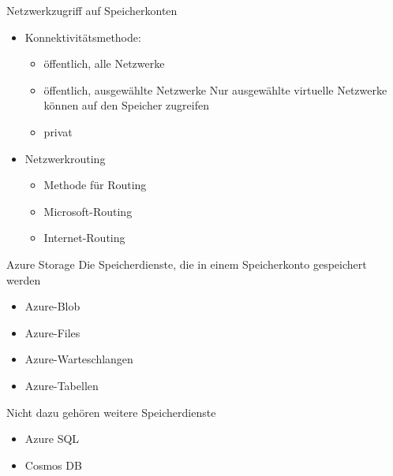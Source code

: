 \begin{flashcard}[Definition]{Netzwerkzugriff auf Speicherkonten}
    \begin{itemize}
        \item Konnektivitätsmethode:
        \begin{itemize}
            \item öffentlich, alle Netzwerke
            \item öffentlich, ausgewählte Netzwerke\newline
            Nur ausgewählte virtuelle Netzwerke können auf den Speicher zugreifen
            \item privat
        \end{itemize}
        \item Netzwerkrouting
        \begin{itemize}
            \item Methode für Routing
            \item Microsoft-Routing
            \item Internet-Routing
        \end{itemize}

    \end{itemize}
\end{flashcard}


\begin{flashcard}[Definition]{Azure Storage}
    Die Speicherdienste, die in einem Speicherkonto gespeichert werden
    \begin{itemize}
        \item Azure-Blob
        \item Azure-Files
        \item Azure-Warteschlangen
        \item Azure-Tabellen
    \end{itemize}
    Nicht dazu gehören weitere Speicherdienste
    \begin{itemize}
        \item Azure SQL
        \item Cosmos DB
    \end{itemize}
\end{flashcard}

